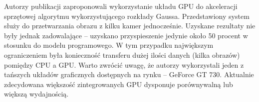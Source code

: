 \documentclass[b5paper,10pt,twoside]{article}
\begin{document}
{%


%



Autorzy publikacji \cite{Boghdady_2015} zaproponowali wykorzystanie układu GPU do akceleracji sprzętowej algorytmu wykorzystującego rozkłady Gaussa. 
Przedstawiony system służy do przetwarzania obrazu z kilku kamer jednocześnie. 
Uzyskane rezultaty nie były jednak zadowalające -- uzyskano przyspieszenie jedynie około 50 procent w stosunku do modelu programowego. %
W tym przypadku największym ograniczeniem była konieczność transferu dużej ilości danych (kilka obrazów) pomiędzy CPU a GPU. 
Warto zwrócić uwagę, że autorzy wykorzystali jeden z tańszych układów graficznych dostępnych na rynku -- GeForce GT 730. 
Aktualnie zdecydowana większość zintegrowanych GPU dysponuje porównywalną lub większą wydajnością. 


}
\end{document}
